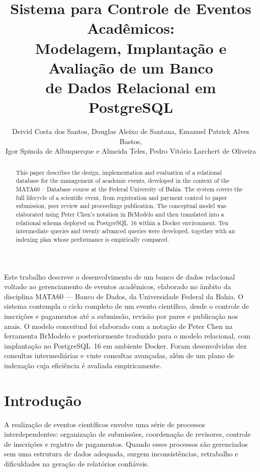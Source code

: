 \documentclass[12pt]{article}
\title{Sistema para Controle de Eventos Acadêmicos:\\
Modelagem, Implantação e Avaliação de um Banco\\
de Dados Relacional em PostgreSQL}
\author{Deivid Costa dos Santos\inst{1},
        Douglas Aleixo de Santana\inst{1},
        Emanuel Patrick Alves Bastos\inst{1},\\
        Igor Spinola de Albuquerque e Almeida Teles\inst{1},
        Pedro Vitório Larchert de Oliveira\inst{1}}
\begin{document}
\maketitle

\begin{abstract}
This paper describes the design, implementation and evaluation of a
relational database for the management of academic events, developed
in the context of the MATA60 -- Database course at the Federal
University of Bahia. The system covers the full lifecycle of a
scientific event, from registration and payment control to paper
submission, peer review and proceedings publication. The conceptual
model was elaborated using Peter Chen's notation in BrModelo and then
translated into a relational schema deployed on PostgreSQL~16 within a
Docker environment. Ten intermediate queries and twenty advanced
queries were developed, together with an indexing plan whose
performance is empirically compared.
\end{abstract}

\begin{resumo}
Este trabalho descreve o desenvolvimento de um banco de dados
relacional voltado ao gerenciamento de eventos acadêmicos, elaborado
no âmbito da disciplina MATA60 --- Banco de Dados, da Universidade
Federal da Bahia. O sistema contempla o ciclo completo de um evento
científico, desde o controle de inscrições e pagamentos até a
submissão, revisão por pares e publicação nos anais. O modelo
conceitual foi elaborado com a notação de Peter Chen na ferramenta
BrModelo e posteriormente traduzido para o modelo relacional, com
implantação no PostgreSQL~16 em ambiente Docker. Foram desenvolvidas
dez consultas intermediárias e vinte consultas avançadas, além de um
plano de indexação cuja eficiência é avaliada empiricamente.
\end{resumo}

\section{Introdução}
\label{sec:introducao}

A realização de eventos científicos envolve uma série de processos interdependentes: organização de submissões, coordenação de revisores, controle de inscrições e registro de pagamentos. Quando esses processos são gerenciados sem uma estrutura de dados adequada, surgem inconsistências, retrabalho e dificuldades na geração de relatórios confiáveis.
\end{document}
